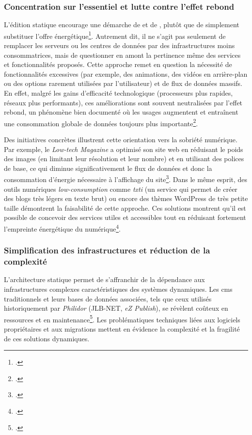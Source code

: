 \subsubsection{Concentration sur l'essentiel et lutte contre l'effet rebond}

L'édition statique encourage une démarche de  et de , plutôt que de simplement substituer l'offre énergétique\footcite{bihouixTransitionEnergetiquePeutelle2019}. 
Autrement dit, il ne s'agit pas seulement de remplacer les serveurs ou les centres de données par des infrastructures moins consommatrices, mais de questionner en amont la pertinence même des services et fonctionnalités proposés. 
Cette approche remet en question la nécessité de fonctionnalités excessives (par exemple, des animations, des vidéos en arrière-plan ou des options rarement utilisées par l’utilisateur) et de flux de données massifs. 
En effet, malgré les gains d'efficacité technologique (processeurs plus rapides, réseaux plus performants), ces améliorations sont souvent neutralisées par l'effet rebond, un phénomène bien documenté où les usages augmentent et entraînent une consommation globale de données toujours plus importante\footcite{bihouixHighTechOuLowTech2022}. 

Des initiatives concrètes illustrent cette orientation vers la sobriété numérique. 
Par exemple, le \emph{Low-tech Magazine} a optimisé son site web en réduisant le poids des images (en limitant leur résolution et leur nombre) et en utilisant des polices de base, ce qui diminue significativement le flux de données et donc la consommation d'énergie nécessaire à l’affichage du site\footcite{novaLowtechNumeriqueAux2020}. 
Dans le même esprit, des outils numériques \textit{low-consumption} comme \emph{txti} (un service qui permet de créer des blogs très légers en texte brut) ou encore des thèmes WordPress de très petite taille démontrent la faisabilité de cette approche. 
Ces solutions montrent qu’il est possible de concevoir des services utiles et accessibles tout en réduisant fortement l’empreinte énergétique du numérique\footcite{novaLowtechNumeriqueAux2020}.

\subsubsection{Simplification des infrastructures et réduction de la complexité}

L'architecture statique permet de s'affranchir de la dépendance aux infrastructures complexes caractéristiques des systèmes dynamiques. Les \gls{cms} traditionnels et leurs bases de données associées, tels que ceux utilisés historiquement par \textit{Philidor} (JLB-NET, \textit{eZ Publish}), se révèlent coûteux en ressources et en maintenance\footcite{otooleSustainableWebEcosystem2013}. Les problématiques techniques liées aux logiciels propriétaires et aux migrations mettent en évidence la complexité et la fragilité de ces solutions dynamiques.

